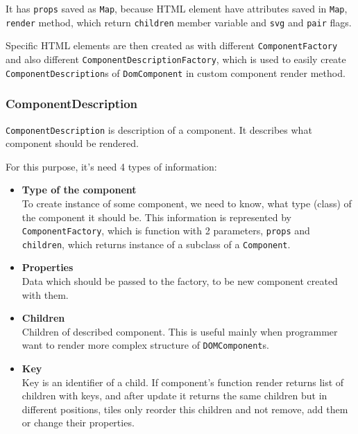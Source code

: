 \documentclass[oneside, 12pt]{book}
\begin{document}
      It has \texttt{props} saved as \texttt{Map}, because HTML element have attributes saved in \texttt{Map},
      \texttt{render} method, which return \texttt{children} member variable and \texttt{svg} and \texttt{pair} flags.

      Specific HTML elements are then created as with different \texttt{ComponentFactory} and also different \texttt{ComponentDescriptionFactory}, 
      which is used to easily create \texttt{ComponentDescription}s of \texttt{DomComponent} in custom component render method. 

    \subsubsection{ComponentDescription}\label{subsubsec:our-architecture-core-component-description}
      \texttt{ComponentDescription} is description of a component. 
      It describes what component should be rendered.

      For this purpose, it's need 4 types of information:
      \begin{itemize}
        \item \textbf{Type of the component} \hfill \\
          To create instance of some component, we need to know, what type (class) of the component it should be. 
          This information is represented by \texttt{ComponentFactory}, 
          which is function with 2 parameters, \texttt{props} and \texttt{children}, 
          which returns instance of a subclass of a \texttt{Component}.
        \item \textbf{Properties} \hfill \\
          Data which should be passed to the factory, to be new component created with them.
        \item \textbf{Children} \hfill \\
          Children of described component.  
          This is useful mainly when programmer want to render more complex structure of \texttt{DOMComponent}s.
        \item \textbf{Key} \hfill \\
          Key is an identifier of a child. If component's function render returns list of children with keys, 
          and after update it returns the same children but in different positions, 
          tiles only reorder this children and not remove, add them or change their properties. 
      \end{itemize}
\end{document}
